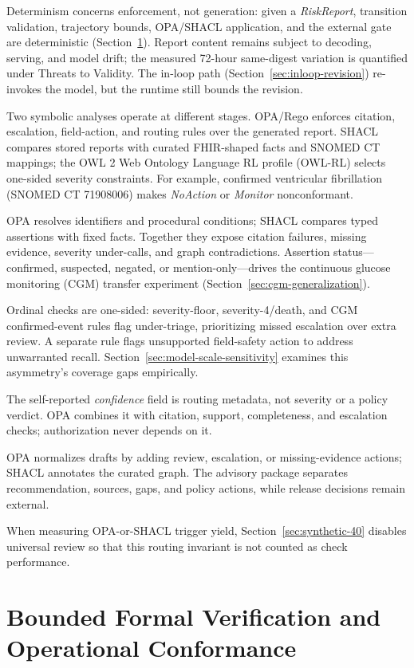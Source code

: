 \documentclass[journal,twoside,web]{ieeecolor}
\begin{document}
Determinism concerns enforcement, not generation: given a \textit{RiskReport}, transition validation, trajectory bounds, OPA/SHACL application, and the external gate are deterministic (Section~\ref{sec:formal-verification}). Report content remains subject to decoding, serving, and model drift; the measured 72-hour same-digest variation is quantified under Threats to Validity. The in-loop path (Section~\ref{sec:inloop-revision}) re-invokes the model, but the runtime still bounds the revision.

Two symbolic analyses operate at different stages. OPA/Rego enforces citation, escalation, field-action, and routing rules over the generated report. SHACL compares stored reports with curated FHIR-shaped facts and SNOMED CT mappings; the OWL 2 Web Ontology Language RL profile (OWL-RL) selects one-sided severity constraints. For example, confirmed ventricular fibrillation (SNOMED CT 71908006) makes \textit{NoAction} or \textit{Monitor} nonconformant.

OPA resolves identifiers and procedural conditions; SHACL compares typed assertions with fixed facts. Together they expose citation failures, missing evidence, severity under-calls, and graph contradictions. Assertion status---confirmed, suspected, negated, or mention-only---drives the continuous glucose monitoring (CGM) transfer experiment (Section~\ref{sec:cgm-generalization}).

Ordinal checks are one-sided: severity-floor, severity-4/death, and CGM confirmed-event rules flag under-triage, prioritizing missed escalation over extra review. A separate rule flags unsupported field-safety action to address unwarranted recall. Section~\ref{sec:model-scale-sensitivity} examines this asymmetry's coverage gaps empirically.

The self-reported \textit{confidence} field is routing metadata, not severity or a policy verdict. OPA combines it with citation, support, completeness, and escalation checks; authorization never depends on it.

OPA normalizes drafts by adding review, escalation, or missing-evidence actions; SHACL annotates the curated graph. The advisory package separates recommendation, sources, gaps, and policy actions, while release decisions remain external.

When measuring OPA-or-SHACL trigger yield, Section~\ref{sec:synthetic-40} disables universal review so that this routing invariant is not counted as check performance.

\section{Bounded Formal Verification and Operational Conformance}
\label{sec:formal-verification}
\end{document}
